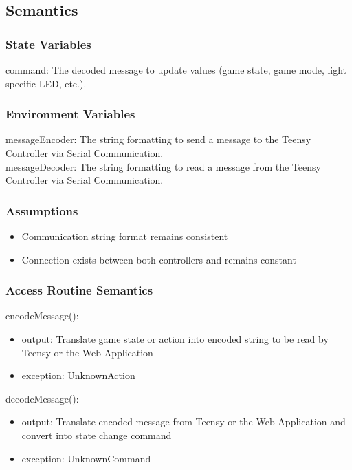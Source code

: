 \documentclass[12pt, titlepage]{article}
\begin{document}
\subsection{Semantics}

\subsubsection{State Variables}{
  command: The decoded message to update values (game state, game mode, light specific LED, etc.).\\
}

\subsubsection{Environment Variables}{
  messageEncoder: The string formatting to send a message to the Teensy Controller via Serial Communication.\\
  messageDecoder: The string formatting to read a message from the Teensy Controller via Serial Communication.\\
}

\subsubsection{Assumptions}{
  \begin{itemize}
    \item Communication string format remains consistent
    \item Connection exists between both controllers and remains constant
  \end{itemize}
  
}

\subsubsection{Access Routine Semantics}

\noindent encodeMessage():
\begin{itemize}
\item output: Translate game state or action into encoded string to be read by Teensy or the Web Application
\item exception: UnknownAction
\end{itemize}

\noindent decodeMessage():
\begin{itemize}
\item output: Translate encoded message from Teensy or the Web Application and convert into state change command
\item exception: UnknownCommand
\end{itemize}
\end{document}

